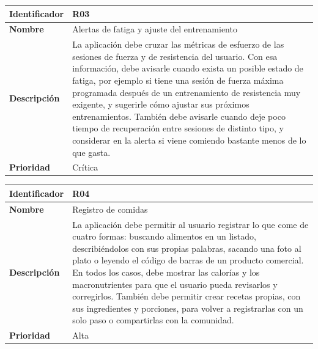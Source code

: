\begin{table}[h!]
    \centering
    \renewcommand{\arraystretch}{1.3}
    \begin{tabular}{|p{3.5cm}|p{11.5cm}|}
        \hline
        \rowcolor[HTML]{EFEFEF} 
        \textbf{Identificador} & \textbf{R03} \\ \hline
        \textbf{Nombre} & Alertas de fatiga y ajuste del entrenamiento \\ \hline
        \textbf{Descripción} & La aplicación debe cruzar las métricas de esfuerzo de las sesiones de fuerza y de resistencia del usuario. Con esa información, debe avisarle cuando exista un posible estado de fatiga, por ejemplo si tiene una sesión de fuerza máxima programada después de un entrenamiento de resistencia muy exigente, y sugerirle cómo ajustar sus próximos entrenamientos. También debe avisarle cuando deje poco tiempo de recuperación entre sesiones de distinto tipo, y considerar en la alerta si viene comiendo bastante menos de lo que gasta. \\ \hline
        \textbf{Prioridad} & Crítica \\ \hline
    \end{tabular}
\end{table}
\newpage
\begin{table}[h!]
    \centering
    \renewcommand{\arraystretch}{1.3}
    \begin{tabular}{|p{3.5cm}|p{11.5cm}|}
        \hline
        \rowcolor[HTML]{EFEFEF} 
        \textbf{Identificador} & \textbf{R04} \\ \hline
        \textbf{Nombre} & Registro de comidas \\ \hline
        \textbf{Descripción} & La aplicación debe permitir al usuario registrar lo que come de cuatro formas: buscando alimentos en un listado, describiéndolos con sus propias palabras, sacando una foto al plato o leyendo el código de barras de un producto comercial. En todos los casos, debe mostrar las calorías y los macronutrientes para que el usuario pueda revisarlos y corregirlos. También debe permitir crear recetas propias, con sus ingredientes y porciones, para volver a registrarlas con un solo paso o compartirlas con la comunidad. \\ \hline
        \textbf{Prioridad} & Alta \\ \hline
    \end{tabular}
\end{table}

